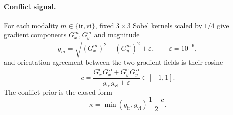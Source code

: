 \documentclass[pdflatex,sn-mathphys-num]{sn-jnl}
\theoremstyle{thmstyleone}%
\theoremstyle{thmstyletwo}%
\theoremstyle{thmstylethree}%
\begin{document}
\paragraph{Conflict signal.}
For each modality $m \in \{\mathrm{ir}, \mathrm{vi}\}$, fixed $3\times 3$ Sobel kernels scaled by $1/4$ give gradient components $G_x^m, G_y^m$ and magnitude
\begin{equation}\label{eq:gm}
g_m = \sqrt{(G_x^m)^2 + (G_y^m)^2 + \varepsilon}, \qquad \varepsilon = 10^{-6},
\end{equation}
and orientation agreement between the two gradient fields is their cosine
\begin{equation}\label{eq:cos}
c = \frac{G_x^{\mathrm{ir}} G_x^{\mathrm{vi}} + G_y^{\mathrm{ir}} G_y^{\mathrm{vi}}}{g_{\mathrm{ir}}\, g_{\mathrm{vi}} + \varepsilon} \in [-1, 1].
\end{equation}
The conflict prior is the closed form
\begin{equation}\label{eq:kappa}
\kappa = \min\!\left(g_{\mathrm{ir}}, g_{\mathrm{vi}}\right)\, \frac{1 - c}{2}.
\end{equation}
\end{document}
